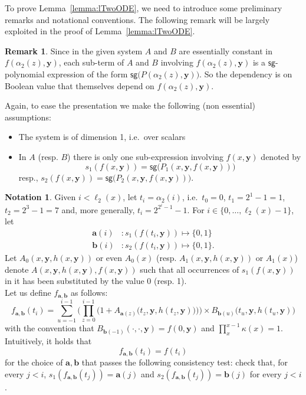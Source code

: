 \documentclass[11pt, oneside]{article}
\newenvironment{toappendix}{}{}
\newcommand{\fun}[1]{\mathsf{#1}}
\newcommand{\tu}[1]{\mathbf{#1}}
\theoremstyle{definition}
\newtheorem{notation}{Notation}
\newtheorem{remark}{Remark}
\begin{document}
\begin{toappendix}
\bigskip 

To prove Lemma~\ref{lemma:lTwoODE}, we need to introduce some preliminary remarks and notational conventions.
%
The following remark will be largely exploited in the proof of Lemma~\ref{lemma:lTwoODE}.


\begin{remark}
    Since in the given system $A$ and $B$ are essentially constant in $f(\alpha_2(z), \tu y)$, each sub-term of $A$ and $B$ involving $f(\alpha_2(z), \tu y)$ is a $\fun{sg}$-polynomial expression of the form $\fun{sg}\big(P(\alpha_2(z), \tu y)\big)$.
    So the dependency is on Boolean value that themselves depend on $f(\alpha_2(z), \tu y)$.
\end{remark}
Again, to ease the presentation we make the following (non essential) assumptions:
\begin{itemize}
    \itemsep0em
    \item The system is of dimension 1, i.e.~over scalars
    \item In $A$ (resp. $B$) there is only one sub-expression involving $f(x, \tu y)$ denoted by
    $$
    s_1(f(x, \tu y)) = \fun{sg}\big(P_1(x, \tu y, f(x, \tu y))\big)
    $$
    resp., $s_2(f(x, \tu y))=\fun{sg}\big(P_2(x,\tu y, f(x, \tu y))\big)$.
\end{itemize}



\begin{notation}
    Given $i<\ell_2(x)$, let $t_i=\alpha_2(i)$, i.e.~$t_0=0$, $t_1=2^1-1=1$, $t_2=2^3-1 =7$ and, more generally, $t_i=2^{2^i-1}-1$.
    For $i\in \{0, \dots, \ell_2(x)-1\}$, let 
    \begin{align*}
        \tu a(i) &: s_1(f(t_i, \tu y)) \mapsto \{0,1\} \\
        \tu b(i) &: s_2(f(t_i, \tu y)) \mapsto \{0,1\}.
    \end{align*}
    Let
    $A_0(x, \tu y, h(x, \tu y))$ or even $A_0(x)$ (resp. $A_1(x, \tu y, h(x, \tu y))$ or $A_1(x)$) denote $A(x, \tu y, h(x, \tu y), f(x, \tu y))$ such that all occurrences of $s_1(f(x,\tu y))$ in it has been substituted by the value 0 (resp. 1).
    \\
    Let us define $f_{\tu a, \tu b}$ as follows:
    $$
        f_{\tu a, \tu b}(t_i) = \sum^{i-1}_{u=-1} \Bigg(\prod^{i-1}_{z=0} \bigg(1+A_{\tu a(z)}\Big(t_z, \tu y, h(t_z, \tu y)\Big)\bigg) \Bigg) \times B_{\tu b(u)} \big(t_u, \tu y, h(t_u, \tu y)\big)
    $$
    with the convention that $B_{\tu b(-1)} (\cdot, \cdot, \tu y) = f(0, \tu y)$ and $\prod^{x-1}_x \kappa(x)=1$.
    Intuitively, it holds that
    $$
    f_{\tu a, \tu b}(t_i) = f(t_i)
    $$
    for the choice of $\tu a, \tu b$ that passes the following consistency test: check that, for every $j<i$, 
    $s_1(f_{\tu a, \tu b}(t_j))=\tu a(j)$ and $s_2(f_{\tu a, \tu b}(t_j))=\tu b(j)$ for every $j<i$.
\end{notation}



\end{toappendix}
\end{document}
